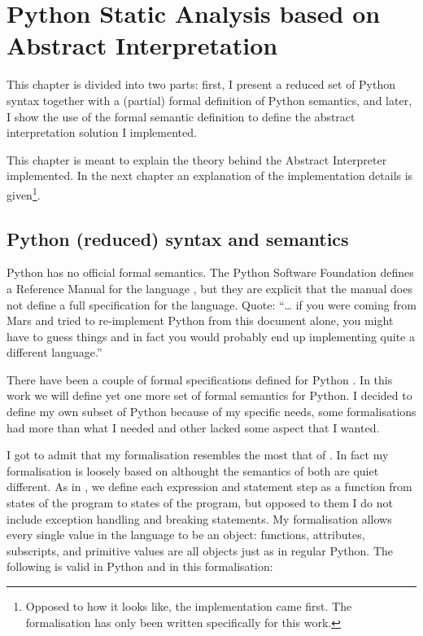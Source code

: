 \chapter{Python Static Analysis based on Abstract Interpretation}%
\label{appendix-ai-theory}

This chapter is divided into two parts: first, I present a reduced set
of Python syntax together with a (partial) formal definition of Python
semantics, and later, I show the use of the formal semantic definition
to define the abstract interpretation solution I implemented.

This chapter is meant to explain the theory behind the Abstract
Interpreter implemented. In the next chapter an explanation of the
implementation details is given\footnote{Opposed to how it looks like,
  the implementation came first. The formalisation has only been written
  specifically for this work.}.

\section{Python (reduced) syntax and semantics}%
\label{python-reduced-syntax-and-semantics}

Python has no official formal semantics. The Python Software Foundation
defines a Reference Manual for the language
\autocite{python_software_foundation_python_2019}, but they are explicit
that the manual does not define a full specification for the language.
Quote: \enquote{\ldots{} if you were coming from Mars and tried to
re-implement Python from this document alone, you might have to guess
things and in fact you would probably end up implementing quite a
different language.}

There have been a couple of formal specifications defined for Python
\autocites{politz_python_2013}{fromherz_static_2018}{guth_formal_2013}{ranson_semantics_2008}.
In this work we will define yet one more set of formal semantics for
Python. I{} decided to define my own subset of Python
because of my specific needs, some formalisations had more than what I
needed and other lacked some aspect that I wanted.

I got to admit that my formalisation resembles the most that of
\textcite{fromherz_static_2018}. In fact my formalisation is loosely
based on \textcite{fromherz_static_2018} althought the semantics of both
are quiet different. As in \textcite{fromherz_static_2018}, we define
each expression and statement step as a function from states of the
program to states of the program, but opposed to them I do not include
exception handling and breaking statements. My formalisation allows
every single value in the language to be an object: functions,
attributes, subscripts, and primitive values are all objects just as in
regular Python. The following is valid in Python and in this
formalisation:

